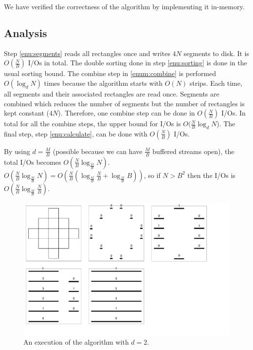 We have verified the correctness of the algorithm by implementing it in-memory.

\subsection{Analysis}

Step \ref{enu:segments} reads all rectangles once and writes $4N$ segments to disk. It is $O(\frac{N}{B})$ I/Os in total. The double sorting done in step \ref{enu:sorting} is done in the usual sorting bound. The combine step in \ref{enum:combine} is performed $O(\log_{d}{N})$ times because the algorithm starts with $O(N)$ strips. Each time, all segments and their associated rectangles are read once. Segments are combined which reduces the number of segments but the number of rectangles is kept constant ($4N$). Therefore, one combine step can be done in $O(\frac{N}{B})$ I/Os. In total for all the combine steps, the upper bound for I/Os is $O(\frac{N}{B}\log_{d}{N}$). The final step, step \ref{enu:calculate}, can be done with $O(\frac{N}{B})$ I/Os.

By using $d = \frac{M}{B}$ (possible because we can have $\frac{M}{B}$ buffered streams open), the total I/Os becomes $O(\frac{N}{B}\log_{\frac{M}{B}}{N})$. $O(\frac{N}{B}\log_{\frac{M}{B}}{N})=O(\frac{N}{B}(\log_{\frac{M}{B}}{\frac{N}{B}}+\log_{\frac{M}{B}}{B}))$, so if $N>B^2$ then the I/Os is $O(\frac{N}{B}\log_{\frac{M}{B}}{\frac{N}{B}})$.



\begin{figure}[h!]
  \centering
  \includegraphics[width=1.12\textwidth]{images/Segments}
  \caption{An execution of the algorithm with $d = 2$.}
  \label{fig:segments}
\end{figure}